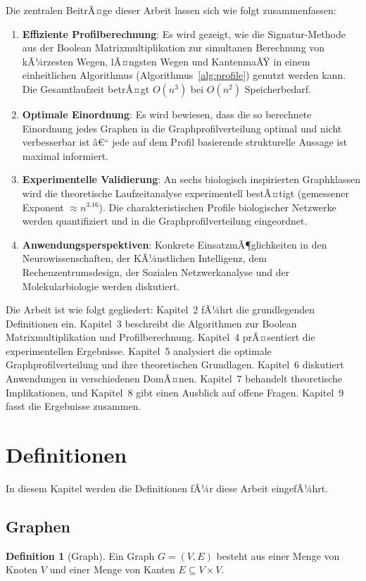 ﻿\documentclass[a4paper,12pt]{article}
\theoremstyle{definition}
\newtheorem{definition}{Definition}
\begin{document}
	Die zentralen BeitrÃ¤ge dieser Arbeit lassen sich wie folgt zusammenfassen:

	\begin{enumerate}
		\item \textbf{Effiziente Profilberechnung}: Es wird gezeigt, wie die Signatur-Methode aus der Boolean Matrixmultiplikation zur simultanen Berechnung von kÃ¼rzesten Wegen, lÃ¤ngsten Wegen und KantenmaÃŸ in einem einheitlichen Algorithmus (Algorithmus~\ref{alg:profile}) genutzt werden kann. Die Gesamtlaufzeit betrÃ¤gt $O(n^3)$ bei $O(n^2)$ Speicherbedarf.
		\item \textbf{Optimale Einordnung}: Es wird bewiesen, dass die so berechnete Einordnung jedes Graphen in die Graphprofilverteilung optimal und nicht verbesserbar ist â€“ jede auf dem Profil basierende strukturelle Aussage ist maximal informiert.
		\item \textbf{Experimentelle Validierung}: An sechs biologisch inspirierten Graphklassen wird die theoretische Laufzeitanalyse experimentell bestÃ¤tigt (gemessener Exponent $\approx n^{3.16}$). Die charakteristischen Profile biologischer Netzwerke werden quantifiziert und in die Graphprofilverteilung eingeordnet.
		\item \textbf{Anwendungsperspektiven}: Konkrete EinsatzmÃ¶glichkeiten in den Neurowissenschaften, der KÃ¼nstlichen Intelligenz, dem Rechenzentrumsdesign, der Sozialen Netzwerkanalyse und der Molekularbiologie werden diskutiert.
	\end{enumerate}

	\bigskip
	\noindent
	Die Arbeit ist wie folgt gegliedert: Kapitel~2 fÃ¼hrt die grundlegenden Definitionen ein. Kapitel~3 beschreibt die Algorithmen zur Boolean Matrixmultiplikation und Profilberechnung. Kapitel~4 prÃ¤sentiert die experimentellen Ergebnisse. Kapitel~5 analysiert die optimale Graphprofilverteilung und ihre theoretischen Grundlagen. Kapitel~6 diskutiert Anwendungen in verschiedenen DomÃ¤nen. Kapitel~7 behandelt theoretische Implikationen, und Kapitel~8 gibt einen Ausblick auf offene Fragen. Kapitel~9 fasst die Ergebnisse zusammen.

	\section{Definitionen}
	In diesem Kapitel werden die Definitionen fÃ¼r diese Arbeit eingefÃ¼hrt.
	\subsection{Graphen}
	\begin{definition}[Graph]
		Ein Graph $G = (V, E)$ besteht aus einer Menge von Knoten $V$ und einer Menge von Kanten $E \subseteq V \times V$.
	\end{definition}
	
\end{document}
